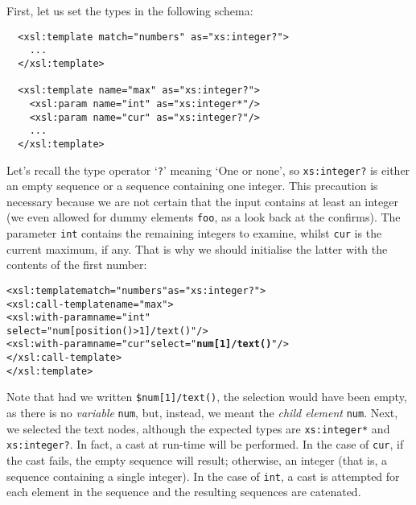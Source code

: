 \noindent First, let us set the types in the following schema:
\begin{verbatim}
  <xsl:template match="numbers" as="xs:integer?">
    ...
  </xsl:template>

  <xsl:template name="max" as="xs:integer?">
    <xsl:param name="int" as="xs:integer*"/>
    <xsl:param name="cur" as="xs:integer?"/>
    ...
  </xsl:template>
\end{verbatim}
Let's recall the type operator `\texttt{?}' meaning `One or none', so
\texttt{xs:integer?} is either an empty sequence or a sequence
containing one integer. This precaution is necessary because we are
not certain that the input contains at least an integer (we even
allowed for dummy elements \texttt{foo}, as a look back at the \DTD
confirms). The parameter \texttt{int} contains the remaining integers
to examine, whilst \texttt{cur} is the current maximum, if any. That
is why we should initialise the latter with the contents of the first
number:
\begin{alltt}
  <xsl:template match="numbers" as="xs:integer?">
    <xsl:call-template name="max">
      <xsl:with-param name="int" 
                      select="num[position()>1]/text()"/>
      <xsl:with-param name="cur" select="\textbf{num[1]/text()}"/>
    </xsl:call-template>
  </xsl:template>
\end{alltt}
Note that had we written \texttt{\$num[1]/text()}, the selection would
have been empty, as there is no \emph{variable} \texttt{num}, but,
instead, we meant the \emph{child element} \texttt{num}. Next, we
selected the text nodes, although the expected types are
\texttt{xs:integer*} and \texttt{xs:integer?}. In fact, a cast at
run\hyp{}time will be performed. In the case of \texttt{cur}, if the
cast fails, the empty sequence will result; otherwise, an integer
(that is, a sequence containing a single integer). In the case of
\texttt{int}, a cast is attempted for each element in the sequence and
the resulting sequences are catenated.

